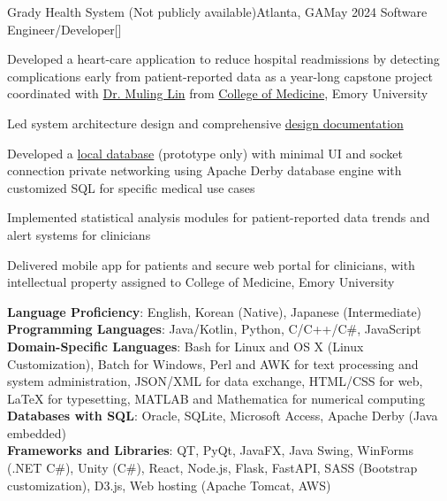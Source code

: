 \begin{resume-itemize}
  {Grady Health System (Not publicly available)}{Atlanta, GA}{May 2024}
  {Software Engineer/Developer}[]
  \item Developed a heart-care application to reduce hospital readmissions by detecting complications early 
  from patient-reported data as a year-long capstone project coordinated with 
  \href{https://www.doximity.com/pub/muling-lin-md-bec64b54}{Dr. Muling Lin} from 
  \href{https://med.emory.edu/departments/medicine/_documents/resident-photo-book-2022-2023.pdf}{College of Medicine}, Emory University
  \item Led system architecture design and comprehensive 
  \href{https://yundaeleesong.github.io/project2405-server_derbyDB-docs.pdf}{design documentation}
  \item Developed a \href{https://github.com/YundaeLeeSong/ydjs-references/tree/main/project2405-server_derbyDB}{local database}
  (prototype only) with minimal UI and socket connection private networking 
  using Apache Derby database engine with customized SQL for specific medical use cases
  \item Implemented statistical analysis modules for patient-reported data trends and alert systems for clinicians
  \item Delivered mobile app for patients and secure web portal for clinicians, 
  with intellectual property assigned to College of Medicine, Emory University
\end{resume-itemize}
\textbf{Language Proficiency}: English, Korean (Native), Japanese (Intermediate)\\
\textbf{Programming Languages}: Java/Kotlin, Python, C/C++/C\#, JavaScript\\
\textbf{Domain-Specific Languages}: Bash for Linux and OS X (Linux Customization), Batch for Windows, 
Perl and AWK for text processing and system administration, 
JSON/XML for data exchange, 
HTML/CSS for web, LaTeX for typesetting, MATLAB and Mathematica for numerical computing\\
\textbf{Databases with SQL}: Oracle, SQLite, Microsoft Access, Apache Derby (Java embedded)\\
\textbf{Frameworks and Libraries}: QT, PyQt, JavaFX, Java Swing, WinForms (.NET C\#), Unity (C\#), 
React, Node.js, Flask, FastAPI, SASS (Bootstrap customization), D3.js, Web hosting (Apache Tomcat, AWS)\\
